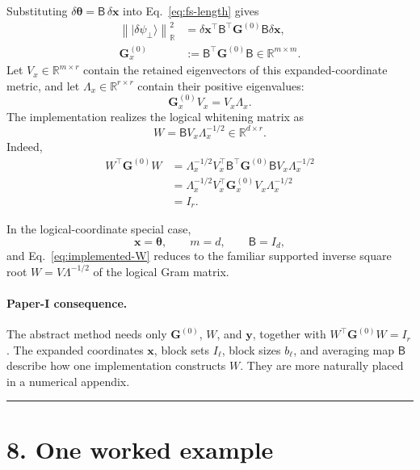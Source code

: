 \documentclass[11pt]{article}
\newcommand{\ket}[1]{\lvert #1\rangle}
\newcommand{\R}{\mathbb R}
\newcommand{\conceptbreak}{%
  \par\medskip\noindent
  {\color{black!30}\rule{\textwidth}{0.35pt}}%
  \par\medskip}
\newcommand{\paperone}{\paragraph{Paper-I consequence.}}
\begin{document}
Substituting
\(\delta\boldsymbol\theta=\mathsf B\,\delta\mathbf x\) into
Eq.~\eqref{eq:fs-length} gives
\begin{align}
\left\|\ket{\delta\psi_\perp}\right\|_{\R}^{2}
&=
\delta\mathbf x^\top
\mathsf B^\top\mathbf G^{(0)}\mathsf B
\delta\mathbf x,\nonumber\\
\mathbf G_x^{(0)}
&:=
\mathsf B^\top\mathbf G^{(0)}\mathsf B
\in\R^{m\times m}.
\label{eq:base-gram}
\end{align}
Let \(V_x\in\R^{m\times r}\) contain the retained eigenvectors of this
expanded-coordinate metric, and let
\(\Lambda_x\in\R^{r\times r}\) contain their positive eigenvalues:
\begin{equation}
\mathbf G_x^{(0)}V_x=V_x\Lambda_x.
\label{eq:base-eigensystem}
\end{equation}
The implementation realizes the logical whitening matrix as
\begin{equation}
\boxed{
W
=
\mathsf B V_x\Lambda_x^{-1/2}
\in\R^{d\times r}.
}
\label{eq:implemented-W}
\end{equation}
Indeed,
\begin{align}
W^\top\mathbf G^{(0)}W
&=
\Lambda_x^{-1/2}V_x^\top
\mathsf B^\top\mathbf G^{(0)}\mathsf B
V_x\Lambda_x^{-1/2}\nonumber\\
&=
\Lambda_x^{-1/2}V_x^\top
\mathbf G_x^{(0)}
V_x\Lambda_x^{-1/2}\nonumber\\
&=I_r.
\label{eq:implemented-whitening-proof}
\end{align}

In the logical-coordinate special case,
\begin{equation}
\mathbf x=\boldsymbol\theta,\qquad
m=d,\qquad
\mathsf B=I_d,
\label{eq:logical-special-case}
\end{equation}
and Eq.~\eqref{eq:implemented-W} reduces to the familiar supported inverse
square root
\(W=V\Lambda^{-1/2}\) of the logical Gram matrix.

\paperone The abstract method needs only
\(\mathbf G^{(0)}\), \(W\), and \(\mathbf y\), together with
\(W^\top\mathbf G^{(0)}W=I_r\).
The expanded coordinates \(\mathbf x\), block sets \(I_\ell\), block sizes
\(b_\ell\), and averaging map \(\mathsf B\) describe how one implementation
constructs \(W\).  They are more naturally placed in a numerical appendix.

\conceptbreak

\section*{8. One worked example}
\end{document}
